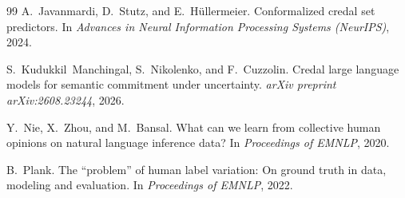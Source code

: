 \documentclass[11pt,a4paper]{article}
\begin{document}
\begin{thebibliography}{99}
A.~Javanmardi, D.~Stutz, and E.~H{\"u}llermeier.
\newblock Conformalized credal set predictors.
\newblock In \emph{Advances in Neural Information Processing Systems (NeurIPS)}, 2024.

S.~Kudukkil~Manchingal, S.~Nikolenko, and F.~Cuzzolin.
\newblock Credal large language models for semantic commitment under uncertainty.
\newblock \emph{arXiv preprint arXiv:2608.23244}, 2026.

Y.~Nie, X.~Zhou, and M.~Bansal.
\newblock What can we learn from collective human opinions on natural language inference data?
\newblock In \emph{Proceedings of EMNLP}, 2020.

B.~Plank.
\newblock The ``problem'' of human label variation: On ground truth in data, modeling and evaluation.
\newblock In \emph{Proceedings of EMNLP}, 2022.

\end{thebibliography}
\end{document}
